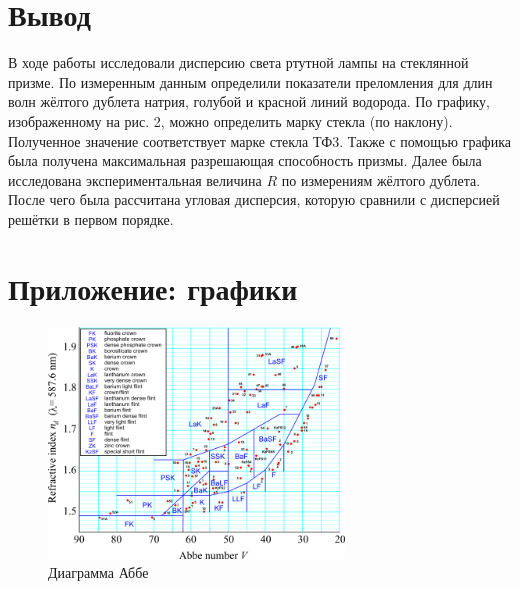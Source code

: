 \documentclass[a4paper]{article}
\begin{document}
\section{Вывод}

В ходе работы исследовали дисперсию света ртутной лампы на стеклянной призме. По измеренным данным определили показатели преломления для длин волн жёлтого дублета натрия, голубой и красной линий водорода. По графику, изображенному на рис. 2, можно определить марку стекла (по наклону). Полученное значение соответствует марке стекла ТФ3. Также с помощью графика была получена максимальная разрешающая способность призмы. Далее была исследована экспериментальная величина $R$ по измерениям жёлтого дублета. После чего была рассчитана угловая дисперсия, которую сравнили с дисперсией решётки в первом порядке.

\section{Приложение: графики}

\begin{figure}[ht!]
    \centering
    \includegraphics[width = 0.7\textwidth]{image/pic3.png}
    \caption{Диаграмма Аббе}
\end{figure}
\end{document}
